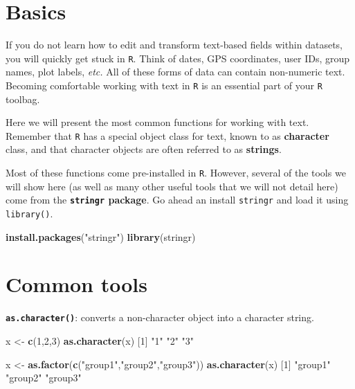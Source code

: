 \documentclass[
]{book}
\newenvironment{Shaded}{\begin{snugshade}}{\end{snugshade}}
\newcommand{\DecValTok}[1]{\textcolor[rgb]{0.00,0.00,0.81}{#1}}
\newcommand{\KeywordTok}[1]{\textcolor[rgb]{0.13,0.29,0.53}{\textbf{#1}}}
\newcommand{\NormalTok}[1]{#1}
\newcommand{\StringTok}[1]{\textcolor[rgb]{0.31,0.60,0.02}{#1}}
\begin{document}
\hypertarget{basics-1}{%
\section*{Basics}\label{basics-1}}

If you do not learn how to edit and transform text-based fields within datasets, you will quickly get stuck in \texttt{R}. Think of dates, GPS coordinates, user IDs, group names, plot labels, \emph{etc.} All of these forms of data can contain non-numeric text. Becoming comfortable working with text in \texttt{R} is an essential part of your \texttt{R} toolbag.

Here we will present the most common functions for working with text. Remember that \texttt{R} has a special object class for text, known to as \textbf{character} class, and that character objects are often referred to as \textbf{strings}.

Most of these functions come pre-installed in \texttt{R}. However, several of the tools we will show here (as well as many other useful tools that we will not detail here) come from the \textbf{\texttt{stringr} package}. Go ahead an install \texttt{stringr} and load it using \texttt{library()}.

\begin{Shaded}
\begin{Highlighting}[]
\KeywordTok{install.packages}\NormalTok{(}\StringTok{"stringr"}\NormalTok{)}
\KeywordTok{library}\NormalTok{(stringr)}
\end{Highlighting}
\end{Shaded}

\hypertarget{common-tools}{%
\section*{Common tools}\label{common-tools}}

\textbf{\texttt{as.character()}}: converts a non-character object into a character string.

\begin{Shaded}
\begin{Highlighting}[]
\NormalTok{x <-}\StringTok{ }\KeywordTok{c}\NormalTok{(}\DecValTok{1}\NormalTok{,}\DecValTok{2}\NormalTok{,}\DecValTok{3}\NormalTok{)}
\KeywordTok{as.character}\NormalTok{(x)}
\NormalTok{[}\DecValTok{1}\NormalTok{] }\StringTok{"1"} \StringTok{"2"} \StringTok{"3"}

\NormalTok{x <-}\StringTok{ }\KeywordTok{as.factor}\NormalTok{(}\KeywordTok{c}\NormalTok{(}\StringTok{"group1"}\NormalTok{,}\StringTok{"group2"}\NormalTok{,}\StringTok{"group3"}\NormalTok{))}
\KeywordTok{as.character}\NormalTok{(x)}
\NormalTok{[}\DecValTok{1}\NormalTok{] }\StringTok{"group1"} \StringTok{"group2"} \StringTok{"group3"}
\end{Highlighting}
\end{Shaded}
\end{document}
